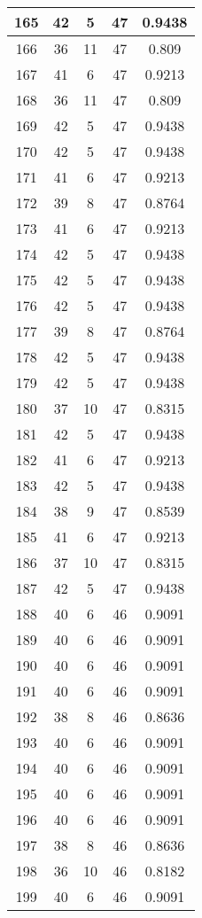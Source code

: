 \documentclass[letterpaper, 12pt]{article}
\begin{document}
\begin{longtable}{|c|c|c|c|c|}
\hline
165 & 42 & 5 & 47 & 0.9438 \\
\hline
166 & 36 & 11 & 47 & 0.809 \\
\hline
167 & 41 & 6 & 47 & 0.9213 \\
\hline
168 & 36 & 11 & 47 & 0.809 \\
\hline
169 & 42 & 5 & 47 & 0.9438 \\
\hline
170 & 42 & 5 & 47 & 0.9438 \\
\hline
171 & 41 & 6 & 47 & 0.9213 \\
\hline
172 & 39 & 8 & 47 & 0.8764 \\
\hline
173 & 41 & 6 & 47 & 0.9213 \\
\hline
174 & 42 & 5 & 47 & 0.9438 \\
\hline
175 & 42 & 5 & 47 & 0.9438 \\
\hline
176 & 42 & 5 & 47 & 0.9438 \\
\hline
177 & 39 & 8 & 47 & 0.8764 \\
\hline
178 & 42 & 5 & 47 & 0.9438 \\
\hline
179 & 42 & 5 & 47 & 0.9438 \\
\hline
180 & 37 & 10 & 47 & 0.8315 \\
\hline
181 & 42 & 5 & 47 & 0.9438 \\
\hline
182 & 41 & 6 & 47 & 0.9213 \\
\hline
183 & 42 & 5 & 47 & 0.9438 \\
\hline
184 & 38 & 9 & 47 & 0.8539 \\
\hline
185 & 41 & 6 & 47 & 0.9213 \\
\hline
186 & 37 & 10 & 47 & 0.8315 \\
\hline
187 & 42 & 5 & 47 & 0.9438 \\
\hline
188 & 40 & 6 & 46 & 0.9091 \\
\hline
189 & 40 & 6 & 46 & 0.9091 \\
\hline
190 & 40 & 6 & 46 & 0.9091 \\
\hline
191 & 40 & 6 & 46 & 0.9091 \\
\hline
192 & 38 & 8 & 46 & 0.8636 \\
\hline
193 & 40 & 6 & 46 & 0.9091 \\
\hline
194 & 40 & 6 & 46 & 0.9091 \\
\hline
195 & 40 & 6 & 46 & 0.9091 \\
\hline
196 & 40 & 6 & 46 & 0.9091 \\
\hline
197 & 38 & 8 & 46 & 0.8636 \\
\hline
198 & 36 & 10 & 46 & 0.8182 \\
\hline
199 & 40 & 6 & 46 & 0.9091 \\
\hline
\end{longtable}
\end{document}
